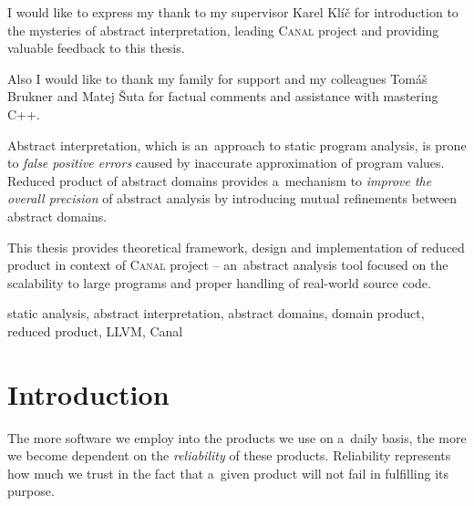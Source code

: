 \documentclass[12pt,oneside]{fithesis2}
\theoremstyle{definition}
\begin{document}
\FrontMatter
\ThesisTitlePage

\begin{ThesisDeclaration}
\DeclarationText
\AdvisorName
\end{ThesisDeclaration}

\begin{ThesisThanks}
I would like to express my thank to my supervisor Karel Klíč for introduction to the mysteries of abstract interpretation, leading \textsc{Canal} project and providing valuable feedback to this thesis.

Also I would like to thank my family for support and my colleagues Tomáš Brukner and Matej Šuta for factual comments and assistance with mastering C++.
\end{ThesisThanks}

\begin{ThesisAbstract}

Abstract interpretation, which is an~approach to static program analysis, is prone to \textit{false positive errors} caused by inaccurate approximation of program values. Reduced product of abstract domains provides a~mechanism to \textit{improve the overall precision} of abstract analysis by introducing mutual refinements between abstract domains.

This thesis provides theoretical framework, design and implementation of reduced product in context of \textsc{Canal} project -- an~abstract analysis tool focused on the scalability to large programs and proper handling of real-world source code.
\end{ThesisAbstract}

\begin{ThesisKeyWords}
static analysis, abstract interpretation, abstract domains, domain product, reduced product, LLVM, Canal
\end{ThesisKeyWords}

\tableofcontents

\MainMatter
\chapter{Introduction}

The more software we employ into the products we use on a~daily basis, the more we become dependent on the \textit{reliability} of these products. Reliability represents how much we trust in the fact that a~given product will not fail in fulfilling its purpose.
\end{document}
